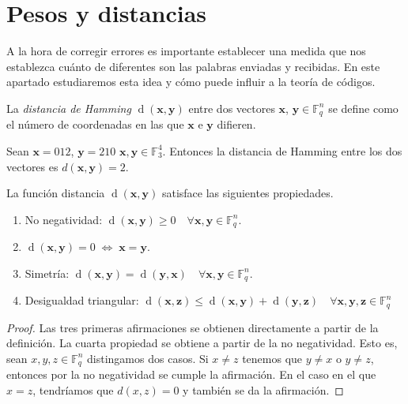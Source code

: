 \section{Pesos y distancias}

A la hora de corregir errores es importante establecer una medida que nos establezca cuánto de diferentes son las palabras enviadas y recibidas. En este apartado estudiaremos esta idea y cómo puede influir a la teoría de códigos.

\begin{definition}
    La \emph{distancia de Hamming} $\operatorname{d}(\mathbf{x},\mathbf{y})$ entre dos vectores $\mathbf{x}$, $\mathbf{y} \in \mathbb{F}_q^n$ se define como el número de coordenadas en las que $\mathbf{x}$ e $\mathbf{y}$ difieren.
\end{definition}

\begin{exampleth}
    Sean $\mathbf{x} = 012$, $\mathbf{y} = 210$ $\mathbf{x}, \mathbf{y} \in \mathbb{F}_3^4$. Entonces la distancia de Hamming entre los dos vectores es $d(\mathbf{x}, \mathbf{y}) = 2$.
\end{exampleth}

\begin{theorem}
    La función distancia $\operatorname{d}(\mathbf{x},\mathbf{y})$ satisface las siguientes propiedades.

    \begin{enumerate}
        \item No negatividad: $\operatorname{d}(\mathbf{x},\mathbf{y}) \geq 0 \quad \forall \mathbf{x},\mathbf{y} \in \mathbb{F}_q^n$.
        \item $\operatorname{d}(\mathbf{x},\mathbf{y}) = 0 \; \Leftrightarrow \; \mathbf{x} = \mathbf{y}$.
        \item Simetría: $\operatorname{d}(\mathbf{x},\mathbf{y}) = \operatorname{d}(\mathbf{y},\mathbf{x}) \quad \forall \mathbf{x},\mathbf{y} \in \mathbb{F}_q^n$.
        \item Desigualdad triangular: $\operatorname{d}(\mathbf{x},\mathbf{z}) \leq \operatorname{d}(\mathbf{x},\mathbf{y}) + \operatorname{d}(\mathbf{y},\mathbf{z}) \quad \forall \mathbf{x},\mathbf{y},\mathbf{z} \in \mathbb{F}_q^n$
    \end{enumerate}
\end{theorem}

\begin{proof}
    Las tres primeras afirmaciones se obtienen directamente a partir de la definición.
    La cuarta propiedad se obtiene a partir de la no negatividad. Esto es, sean $x,y,z \in \mathbb{F}_q^n$ distingamos dos casos. Si $x \neq z$
    tenemos que $y \neq x$ o $y \neq z$, entonces por la no negatividad se cumple la afirmación.
    En el caso en el que $x = z$, tendríamos que $d(x,z) = 0$ y también se da la 
    afirmación.
\end{proof}

